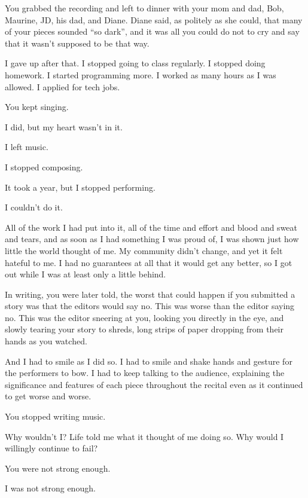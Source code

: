 \begin{paracol}{2}
\begin{leftcolumn}
\begin{ally}
You grabbed the recording and left to dinner with your mom and dad, Bob, Maurine, JD, his dad, and Diane. Diane said, as politely as she could, that many of your pieces sounded ``so dark'', and it was all you could do not to cry and say that it wasn't supposed to be that way.
\end{ally}
I gave up after that. I stopped going to class regularly. I stopped doing homework. I started programming more. I worked as many hours as I was allowed. I applied for tech jobs.

\begin{ally}
You kept singing.
\end{ally}
I did, but my heart wasn't in it.

I left music.

I stopped composing.

It took a year, but I stopped performing.

I couldn't do it.

All of the work I had put into it, all of the time and effort and blood and sweat and tears, and as soon as I had something I was proud of, I was shown just how little the world thought of me. My community didn't change, and yet it felt hateful to me. I had no guarantees at all that it would get any better, so I got out while I was at least only a little behind.

\begin{ally}
In writing, you were later told, the worst that could happen if you submitted a story was that the editors would say no. This was worse than the editor saying no. This was the editor sneering at you, looking you directly in the eye, and slowly tearing your story to shreds, long strips of paper dropping from their hands as you watched.
\end{ally}
And I had to smile as I did so. I had to smile and shake hands and gesture for the performers to bow. I had to keep talking to the audience, explaining the significance and features of each piece throughout the recital even as it continued to get worse and worse.

\begin{ally}
You stopped writing music.
\end{ally}
Why wouldn't I? Life told me what it thought of me doing so. Why would I willingly continue to fail?

\begin{ally}
You were not strong enough.
\end{ally}
I was not strong enough.


\end{leftcolumn}
\end{paracol}
